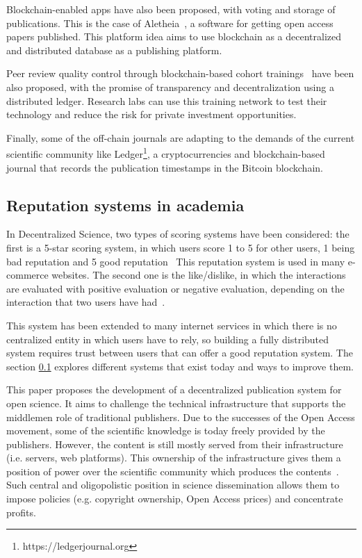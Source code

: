 Blockchain-enabled apps have also been proposed, with voting and storage of
publications. This is the case of Aletheia~\cite{morton2017aletheia}, a software
for getting open access papers published. This platform idea aims to use
blockchain as a decentralized and distributed database as a publishing platform.

Peer review quality control through blockchain-based cohort
trainings~\cite{dhillon2016bench} have been also proposed, with the promise of
transparency and decentralization using a distributed ledger. Research labs can
use this training network to test their technology and reduce the risk for
private investment opportunities.

Finally, some of the off-chain journals are adapting to the demands of the
current scientific community like Ledger\footnote{https://ledgerjournal.org}, a
cryptocurrencies and blockchain-based journal that records the publication
timestamps in the Bitcoin blockchain.

\subsection{Reputation systems in academia}
\label{soa:rs}

In Decentralized Science, two types of scoring systems have been considered: the
first is a 5-star scoring system, in which users score 1 to 5 for other users, 1
being bad reputation and 5 good reputation~\cite{} This reputation system is
used in many e-commerce websites. The second one is the like/dislike, in which
the interactions are evaluated with positive evaluation or negative evaluation,
depending on the interaction that two users have had~\cite{}.

This system has been extended to many internet services in which there is no
centralized entity in which users have to rely, so building a fully distributed
system requires trust between users that can offer a good reputation system. The
section \ref{soa:rs} explores different systems that exist today and ways to
improve them.

This paper proposes the development of a decentralized publication system for
open science. It aims to challenge the technical infrastructure that supports
the middlemen role of traditional publishers. Due to the successes of the Open
Access movement, some of the scientific knowledge is today freely provided by
the publishers. However, the content is still mostly served from their
infrastructure (i.e. servers, web platforms). This ownership of the
infrastructure gives them a position of power over the scientific community
which produces the contents~\cite{fuster2010governance}. Such central and
oligopolistic position in science dissemination allows them to impose policies
(e.g. copyright ownership, Open Access prices) and concentrate profits.

